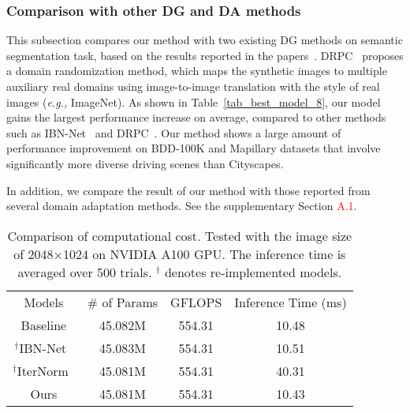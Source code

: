 \documentclass[final]{latex/cvpr}
\newcommand{\drule}{\specialrule{0.2pt}{1pt}{1pt}\specialrule{0.2pt}{0pt}{\belowrulesep}}
\newcommand{\todow}[1]{\textcolor{red}{#1}}
\begin{document}
\vspace{-0.35cm}
\subsubsection{Comparison with other DG and DA methods}
\vspace{-0.2cm}
This subsection compares our method with two existing DG methods on semantic segmentation task, based on the results reported in the papers~\cite{pan2018two,yue2019domain}. DRPC~\cite{yue2019domain} proposes a domain randomization method, which maps the synthetic images to multiple auxiliary real domains using image-to-image translation with the style of real images (\textit{e.g.,} ImageNet). As shown in Table~\ref{tab_best_model_8}, our model gains the largest performance increase on average, compared to other methods such as IBN-Net~\cite{pan2018two} and DRPC~\cite{yue2019domain}. Our method shows a large amount of performance improvement on BDD-100K and Mapillary datasets that involve significantly more diverse driving scenes than Cityscapes.

In addition, we compare the result of our method with those reported from several domain adaptation methods. See the supplementary Section \todow{A.1}.















\begin{table}[t!]
\vspace*{-0.0cm}
\begin{center}
\setlength\tabcolsep{4.2pt}
\footnotesize
\begin{tabular}{c|c|c|c}
\toprule
Models & \# of Params & GFLOPS & Inference Time (ms) \\
\drule
Baseline  & 45.082M & 554.31 &  10.48\\ 
\midrule
$^\dagger$IBN-Net~\cite{pan2018two}      & 45.083M & 554.31 &  10.51\\
\midrule
$^\dagger$IterNorm~\cite{huang2019iterative} & 45.081M & 554.31 &  40.31\\ 
\midrule
Ours    & 45.081M & 554.31 &  10.43 \\
\bottomrule
\end{tabular}
\end{center}
\vspace*{-0.2cm}
\caption{Comparison of computational cost. Tested with the image size of 2048$\times$1024 on NVIDIA A100 GPU. The inference time is averaged over 500 trials. $^\dagger$ denotes re-implemented models.}
\label{tab_computational_cost}
\vspace*{-0.5cm}
\end{table}
\end{document}
